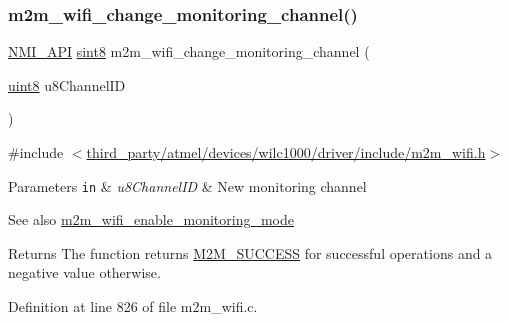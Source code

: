 \subsubsection{\texorpdfstring{m2m\+\_\+wifi\+\_\+change\+\_\+monitoring\+\_\+channel()}{m2m\_wifi\_change\_monitoring\_channel()}}
{\footnotesize\ttfamily \hyperlink{group__BSPDefine_gaecc0323d771e41ef81a76b5f12783e22}{N\+M\+I\+\_\+\+A\+PI} \hyperlink{group__DataT_gae35f10ffd0ac8dd2bc3e794da9bdfbc7}{sint8} m2m\+\_\+wifi\+\_\+change\+\_\+monitoring\+\_\+channel (\begin{DoxyParamCaption}\item[{\hyperlink{group__DataT_ga4df709a77647e870bbf1d955b8edc9a6}{uint8}}]{u8\+Channel\+ID }\end{DoxyParamCaption})}



{\ttfamily \#include $<$\hyperlink{m2m__wifi_8h}{third\+\_\+party/atmel/devices/wilc1000/driver/include/m2m\+\_\+wifi.\+h}$>$}


\begin{DoxyParams}[1]{Parameters}
\mbox{\tt in}  & {\em u8\+Channel\+ID} & New monitoring channel \\
\hline
\end{DoxyParams}
\begin{DoxySeeAlso}{See also}
\hyperlink{group__WifiEnableMonitorModeFn_gac208f9fc4c1ac93d3fc3e8a81c3c2223}{m2m\+\_\+wifi\+\_\+enable\+\_\+monitoring\+\_\+mode} 
\end{DoxySeeAlso}
\begin{DoxyReturn}{Returns}
The function returns \hyperlink{nm__common_8h_a9ef27ba27aafdd1aa3a79d3ba2c36b8f}{M2\+M\+\_\+\+S\+U\+C\+C\+E\+SS} for successful operations and a negative value otherwise. 
\end{DoxyReturn}


Definition at line 826 of file m2m\+\_\+wifi.\+c.


